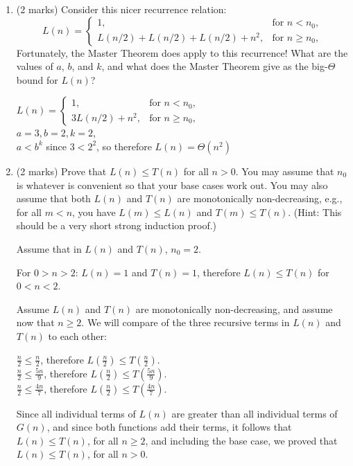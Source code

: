 \documentclass[11pt]{article}
\begin{document}
\begin{enumerate}
\item (2 marks)
Consider this nicer recurrence relation:
  \[
  L(n) = \left\{
  \begin{array}{ll}
    1, & \mbox{for $n < n_0$}, \\
    L(n/2) + L(n/2) + L(n/2) + n^2, & \mbox{for $n \ge n_0$},
  \end{array} \right.
  \]
Fortunately, the Master Theorem does apply to this recurrence!
What are the values of $a$, $b$, and $k$, and what does the
Master Theorem give as the big-$\Theta$ bound for $L(n)$?

\begin{soln}
$L(n) = \left\{
  \begin{array}{ll}
    1, & \mbox{for $n < n_0$}, \\
    3L(n/2) + n^2, & \mbox{for $n \ge n_0$}, 
  \end{array} \right.$ \\
  $a=3, b=2, k=2$,\\
  $a < b^k$ since $3 < 2^2$, so therefore $L(n) = \Theta(n^2)$
\end{soln}

\item (2 marks)
Prove that $L(n)\le T(n)$ for all $n>0$.  You may assume that $n_0$
is whatever is convenient so that your base cases work out.
You may also assume that both $L(n)$ and $T(n)$ are monotonically
non-decreasing, e.g., for all $m<n$, you have $L(m)\le L(n)$
and $T(m)\le T(n)$.
(Hint:  This should be a very short strong induction proof.)

\begin{soln}
Assume that in $L(n)$ and $T(n)$, $n_0 = 2$.

For $0>n>2$: $L(n) = 1$ and $T(n) = 1$, therefore $L(n) \leq T(n)$ for $0<n<2$.

Assume $L(n)$ and $T(n)$ are monotonically non-decreasing, and assume now that $n \geq 2$. We will compare  of the three recursive terms in $L(n)$ and $T(n)$ to each other:

$\frac{n}{2} \leq \frac{n}{2}$, therefore $L(\frac{n}{2}) \leq T(\frac{n}{2})$. \\
$\frac{n}{2} \leq \frac{5n}{9}$, therefore $L(\frac{n}{2}) \leq T(\frac{5n}{9})$. \\
$\frac{n}{2} \leq \frac{4n}{7}$, therefore $L(\frac{n}{2}) \leq T(\frac{4n}{7})$.

Since all individual terms of $L(n)$ are greater than all individual terms of $G(n)$, and since both functions add their terms, it follows that $L(n) \leq T(n)$, for all $n \geq 2$, and including the base case, we proved that $L(n) \leq T(n)$, for all $n > 0$.
\end{soln}


\end{enumerate}
\end{document}
